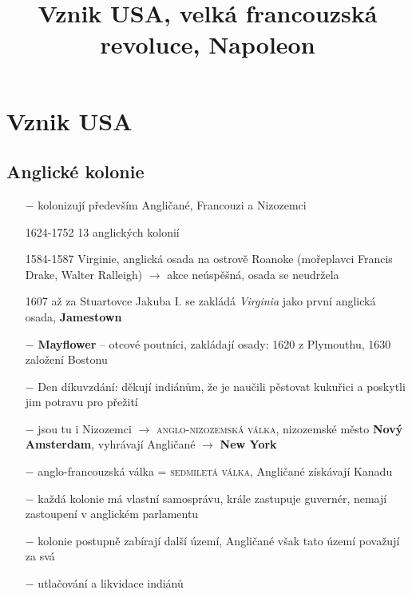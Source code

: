 \documentclass{article}
\title{\vspace{-2cm}Vznik USA, velká francouzská revoluce, Napoleon\vspace{-1.7cm}}
\date{}
\author{}
\begin{document}
\maketitle

\section*{Vznik USA}
\subsection*{Anglické kolonie}
\begin{itemize}
    \vspace{-0.5em}
    \setlength\itemsep{0.15em}
    \item[$-$] kolonizují především Angličané, Francouzi a Nizozemci
    \item[1624-1752] 13 anglických kolonií
    \item[1584-1587] Virginie, anglická osada na ostrově Roanoke (mořeplavci Francis Drake, Walter Ralleigh) $\rightarrow$ akce neúspěšná, osada se neudržela
    \item[1607] až za Stuartovce Jakuba I. se zakládá \textit{Virginia} jako první anglická osada, \textbf{Jamestown}
    \item[$-$] \textbf{Mayflower} -- otcové poutníci, zakládají osady: 1620 z Plymouthu, 1630 založení Bostonu
    \item[$-$] Den díkuvzdání: děkují indiánům, že je naučili pěstovat kukuřici a poskytli jim potravu pro přežití
    \item[$-$] jsou tu i Nizozemci $\rightarrow$ \textsc{anglo-nizozemská válka}, nizozemské město \textbf{Nový Amsterdam}, vyhrávají Angličané $\rightarrow$ \textbf{New York}
    \item[$-$] anglo-francouzská válka = \textsc{sedmiletá válka}, Angličané získávají Kanadu
    \item[$-$] každá kolonie má vlastní samosprávu, krále zastupuje guvernér, nemají zastoupení v anglickém parlamentu
    \item[$-$] kolonie postupně zabírají další území, Angličané však tato území považují za svá
    \item[$-$] utlačování a likvidace indiánů
\end{itemize}
\end{document}
